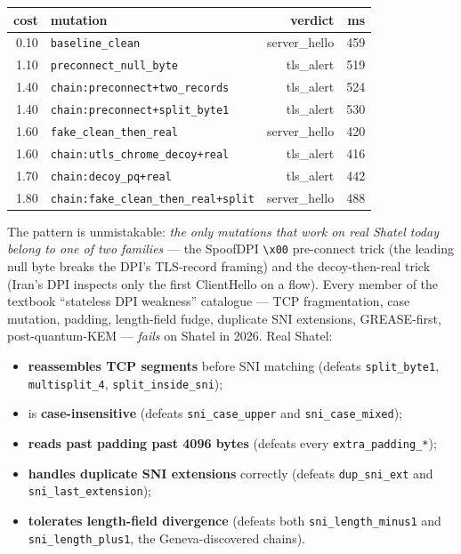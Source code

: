 \documentclass[letterpaper,twocolumn,10pt]{article}
\begin{document}
\begin{center}
{\small
\begin{tabular}{rlrr}
\toprule
\textbf{cost} & \textbf{mutation} & \textbf{verdict} & \textbf{ms} \\
\midrule
0.10 & \texttt{baseline\_clean}                       & server\_hello & 459 \\
1.10 & \texttt{preconnect\_null\_byte}                & tls\_alert    & 519 \\
1.40 & \texttt{chain:preconnect+two\_records}         & tls\_alert    & 524 \\
1.40 & \texttt{chain:preconnect+split\_byte1}         & tls\_alert    & 530 \\
1.60 & \texttt{fake\_clean\_then\_real}               & server\_hello & 420 \\
1.60 & \texttt{chain:utls\_chrome\_decoy+real}        & tls\_alert    & 416 \\
1.70 & \texttt{chain:decoy\_pq+real}                  & tls\_alert    & 442 \\
1.80 & \texttt{chain:fake\_clean\_then\_real+split}   & server\_hello & 488 \\
\bottomrule
\end{tabular}}
\end{center}

The pattern is unmistakable: \emph{the only mutations that work on
real Shatel today belong to one of two families} — the SpoofDPI
\texttt{\textbackslash{}x00} pre-connect trick (the leading null
byte breaks the DPI's TLS-record framing) and the decoy-then-real
trick (Iran's DPI inspects only the first ClientHello on a flow).
Every member of the textbook ``stateless DPI weakness''
catalogue — TCP fragmentation, case mutation, padding, length-field
fudge, duplicate SNI extensions, GREASE-first, post-quantum-KEM —
\emph{fails} on Shatel in 2026. Real Shatel:

\begin{itemize}
    \item \textbf{reassembles TCP segments} before SNI matching (defeats
    \texttt{split\_byte1}, \texttt{multisplit\_4},
    \texttt{split\_inside\_sni});
    \item is \textbf{case-insensitive} (defeats \texttt{sni\_case\_upper}
    and \texttt{sni\_case\_mixed});
    \item \textbf{reads past padding past 4096 bytes} (defeats every
    \texttt{extra\_padding\_*});
    \item \textbf{handles duplicate SNI extensions} correctly (defeats
    \texttt{dup\_sni\_ext} and \texttt{sni\_last\_extension});
    \item \textbf{tolerates length-field divergence} (defeats both
    \texttt{sni\_length\_minus1} and \texttt{sni\_length\_plus1}, the
    Geneva-discovered chains).
\end{itemize}
\end{document}
